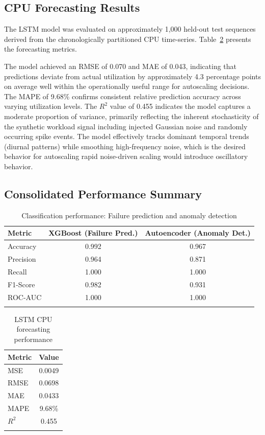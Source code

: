 \documentclass[sn-nature]{sn-jnl}
\theoremstyle{thmstyleone}
\theoremstyle{thmstyletwo}
\theoremstyle{thmstylethree}
\begin{document}
\subsection{CPU Forecasting Results}\label{subsec:cpuresults}

The LSTM model was evaluated on approximately 1,000 held-out test sequences derived from the chronologically partitioned CPU time-series.
Table~\ref{tab:forecasting} presents the forecasting metrics.

The model achieved an RMSE of 0.070 and MAE of 0.043, indicating that predictions deviate from actual utilization by approximately 4.3 percentage points on average well within the operationally useful range for autoscaling decisions.
The MAPE of 9.68\% confirms consistent relative prediction accuracy across varying utilization levels.
The $R^2$ value of 0.455 indicates the model captures a moderate proportion of variance, primarily reflecting the inherent stochasticity of the synthetic workload signal including injected Gaussian noise and randomly occurring spike events.
The model effectively tracks dominant temporal trends (diurnal patterns) while smoothing high-frequency noise, which is the desired behavior for autoscaling rapid noise-driven scaling would introduce oscillatory behavior.

\subsection{Consolidated Performance Summary}\label{subsec:consolidated}

\begin{table}[htbp]
\centering
\caption{Classification performance: Failure prediction and anomaly detection}\label{tab:classification}
\begin{tabular}{lcc}
\toprule
\textbf{Metric} & \textbf{XGBoost (Failure Pred.)} & \textbf{Autoencoder (Anomaly Det.)} \\
\midrule
Accuracy & 0.992 & 0.967 \\
Precision & 0.964 & 0.871 \\
Recall & 1.000 & 1.000 \\
F1-Score & 0.982 & 0.931 \\
ROC-AUC & 1.000 & 1.000 \\
\botrule
\end{tabular}
\end{table}

\begin{table}[htbp]
\centering
\caption{LSTM CPU forecasting performance}\label{tab:forecasting}
\begin{tabular*}{0.5\columnwidth}{@{\extracolsep{\fill}}lc@{}}
\toprule
\textbf{Metric} & \textbf{Value} \\
\midrule
MSE & 0.0049 \\
RMSE & 0.0698 \\
MAE & 0.0433 \\
MAPE & 9.68\% \\
$R^2$ & 0.455 \\
\botrule
\end{tabular*}
\end{table}
\end{document}
